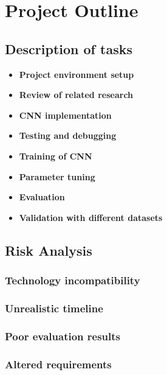 \let\textcircled=\pgftextcircled
\chapter{Project Outline}
\label{chap:proj_outline}

\section{Description of tasks}

\begin{itemize}
    \item \textbf{Project environment setup}
    \item \textbf{Review of related research}
    \item \textbf{CNN implementation}
    \item \textbf{Testing and debugging}
    \item \textbf{Training of CNN}
    \item \textbf{Parameter tuning}
    \item \textbf{Evaluation}
    \item \textbf{Validation with different datasets}
\end{itemize}






\section{Risk Analysis}
 
\subsection*{Technology incompatibility}

\subsection*{Unrealistic timeline}
	
	
	
\subsection*{Poor evaluation results}



\subsection*{Altered requirements}


